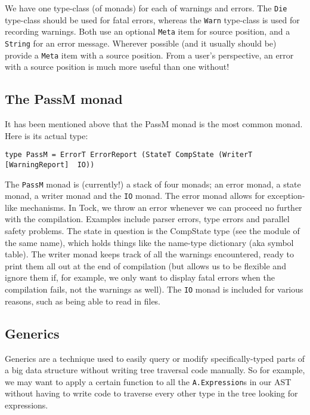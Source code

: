 \documentclass[a4wide]{article}
\begin{document}
We have one type-class (of monads) for each of warnings and errors.  The \lstinline|Die| type-class should be used for fatal
errors, whereas the \lstinline|Warn| type-class is used for recording warnings.  Both use an optional \lstinline|Meta| item for source position,
and a \lstinline|String| for an error message.  Wherever possible (and it usually should be) provide a \lstinline|Meta| item with a source
position.  From a user's perspective, an error with a source position is much more useful than one without!

\subsection{The PassM monad}

It has been mentioned above that the PassM monad is the most common monad.  Here is its actual type:

\begin{lstlisting}
type PassM = ErrorT ErrorReport (StateT CompState (WriterT [WarningReport]  IO))
\end{lstlisting}

The \lstinline|PassM| monad is (currently!) a stack of four monads; an error monad, a state monad, a writer monad and the \lstinline|IO| monad.  The error
monad allows for exception-like mechanisms.  In Tock, we throw an error whenever we can proceed no further
with the compilation.  Examples include parser errors, type errors and parallel safety problems.  The
state in question is the CompState type (see the module of the same name), which holds things like the
name-type dictionary (aka symbol table).  The writer monad keeps track of all the warnings encountered,
ready to print them all out at the end of compilation (but allows us to be flexible and ignore them if, for example,
we only want to display fatal errors when the compilation fails, not the warnings as well).  
The \lstinline|IO| monad is included for various reasons, such as being able to read in files.

\subsection{Generics}

Generics are a technique used to easily query or modify specifically-typed parts of a big data structure
without writing tree traversal code manually.  So for example, we may want to apply a certain function
to all the \lstinline|A.Expression|s in our AST without having to write code to traverse every other
type in the tree looking for expressions.
\end{document}
